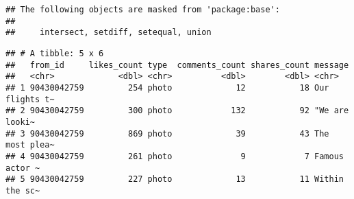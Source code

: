 \documentclass[]{article}
\newenvironment{Shaded}{\begin{snugshade}}{\end{snugshade}}
\newcommand{\KeywordTok}[1]{\textcolor[rgb]{0.13,0.29,0.53}{\textbf{#1}}}
\newcommand{\DecValTok}[1]{\textcolor[rgb]{0.00,0.00,0.81}{#1}}
\newcommand{\StringTok}[1]{\textcolor[rgb]{0.31,0.60,0.02}{#1}}
\newcommand{\CommentTok}[1]{\textcolor[rgb]{0.56,0.35,0.01}{\textit{#1}}}
\newcommand{\OperatorTok}[1]{\textcolor[rgb]{0.81,0.36,0.00}{\textbf{#1}}}
\newcommand{\NormalTok}[1]{#1}
\begin{document}
\begin{verbatim}
## The following objects are masked from 'package:base':
## 
##     intersect, setdiff, setequal, union
\end{verbatim}

\begin{Shaded}
\end{Shaded}

\begin{verbatim}
## # A tibble: 5 x 6
##   from_id     likes_count type  comments_count shares_count message       
##   <chr>             <dbl> <chr>          <dbl>        <dbl> <chr>         
## 1 90430042759         254 photo             12           18 Our flights t~
## 2 90430042759         300 photo            132           92 "We are looki~
## 3 90430042759         869 photo             39           43 The most plea~
## 4 90430042759         261 photo              9            7 Famous actor ~
## 5 90430042759         227 photo             13           11 Within the sc~
\end{verbatim}

\begin{Shaded}
\end{Shaded}
\end{document}
